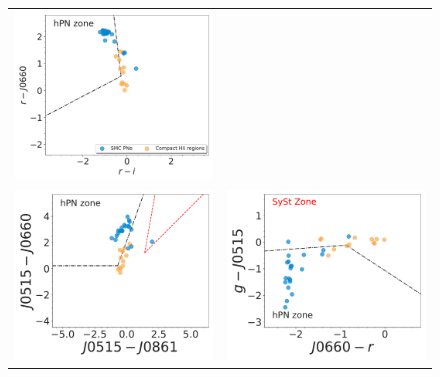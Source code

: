 \documentclass[11pt]{article}
\newcommand\raiselabel[1]{\raisebox{0.9\figwidth}[-0.5\figwidth]{#1}}
\begin{document}
\begin{figure}
\centering
\begin{tabular}{l l}
\includegraphics[width=0.5\linewidth, trim=10 10 10 10, clip]{Fig1-pne-smc-splus-match-2007-compat-HIIRegions-smc-match-splus-vironen.pdf} & \\
 \includegraphics[width=0.5\linewidth, trim=10 10 10 10, clip]{Fig2-pne-smc-splus-match-2007-compat-HIIRegions-smc-match-splus-J0515_J0660.pdf} & \includegraphics[width=0.5\linewidth, trim=10 10 10 10, clip]{Fig4-pne-smc-splus-match-2007-compat-HIIRegions-smc-match-splus-g.pdf} \\

\end{tabular}
\end{figure}
\end{document}
